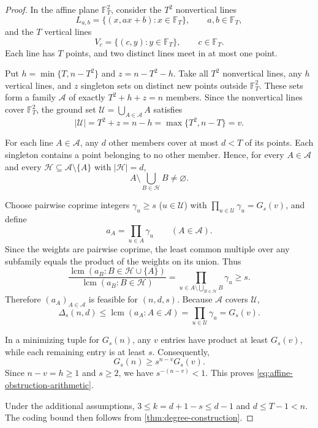 \documentclass[11pt,onecolumn]{IEEEtran}
\newcommand{\lcmop}{\operatorname{lcm}}
\begin{document}
\begin{proof}
In the affine plane $\mathbb F_T^2$, consider the $T^2$
nonvertical lines
\[
L_{a,b}=\{(x,ax+b):x\in\mathbb F_T\},
\qquad a,b\in\mathbb F_T,
\]
and the $T$ vertical lines
\[
V_c=\{(c,y):y\in\mathbb F_T\},\qquad c\in\mathbb F_T.
\]
Each line has $T$ points, and two distinct lines meet in at
most one point.

Put $h=\min\{T,n-T^2\}$ and $z=n-T^2-h$.
Take all $T^2$ nonvertical lines, any $h$ vertical lines, and
$z$ singleton sets on distinct new points outside $\mathbb F_T^2$.
These sets form a family $\mathcal A$ of exactly
$T^2+h+z=n$ members. Since the nonvertical lines cover $\mathbb F_T^2$,
the ground set $\mathcal U=\bigcup_{A\in\mathcal A}A$ satisfies
\[
|\mathcal U|=T^2+z=n-h=\max\{T^2,n-T\}=v.
\]

For each line $A\in\mathcal A$, any $d$ other members cover
at most $d<T$ of its points. Each singleton contains a point
belonging to no other member. Hence, for every $A\in\mathcal A$
and every $\mathcal H\subseteq\mathcal A\setminus\{A\}$ with
$|\mathcal H|=d$,
\[
A\setminus\bigcup_{B\in\mathcal H}B\ne\varnothing.
\]

Choose pairwise coprime integers $\gamma_u\ge s$
($u\in\mathcal U$) with
$\prod_{u\in\mathcal U}\gamma_u=G_s(v)$, and define
\[
a_A=\prod_{u\in A}\gamma_u\qquad(A\in\mathcal A).
\]
Since the weights are pairwise coprime, the least common
multiple over any subfamily equals the product of the weights
on its union. Thus
\[
\frac{\lcmop(a_B:B\in\mathcal H\cup\{A\})}
     {\lcmop(a_B:B\in\mathcal H)}
=\prod_{u\in A\setminus\bigcup_{B\in\mathcal H}B}\gamma_u
\ge s.
\]
Therefore $(a_A)_{A\in\mathcal A}$ is feasible for $(n,d,s)$.
Because $\mathcal A$ covers $\mathcal U$,
\[
\Delta_s(n,d)\le\lcmop(a_A:A\in\mathcal A)
=\prod_{u\in\mathcal U}\gamma_u=G_s(v).
\]

In a minimizing tuple for $G_s(n)$, any $v$ entries have
product at least $G_s(v)$, while each remaining entry is
at least $s$. Consequently,
\[
G_s(n)\ge s^{n-v}G_s(v).
\]
Since $n-v=h\ge1$ and $s\ge2$, we have $s^{-(n-v)}<1$.
This proves \eqref{eq:affine-obstruction-arithmetic}.

Under the additional assumptions,
$3\le k=d+1-s\le d-1$ and $d\le T-1<n$.
The coding bound then follows from
\cref{thm:degree-construction}.
\end{proof}
\end{document}

